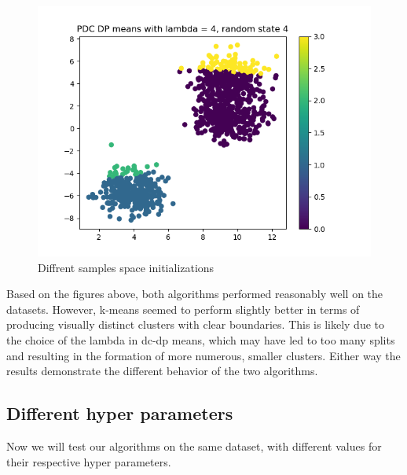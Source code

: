 \documentclass[12pt]{article}
\begin{document}
\begin{figure}
\begin{minipage}{0.5\textwidth}
    \end{minipage}
    \begin{minipage}{0.5\textwidth}
    \centering
    \includegraphics[scale=0.4]{images/task2_drs_rs4__l4}
    \end{minipage}
    \caption{Diffrent samples space initializations}\label{fig:figure4}
\end{figure}

Based on the figures above, both algorithms performed reasonably well on the datasets.
However, k-means seemed to perform slightly better in terms of producing visually distinct clusters with clear boundaries.
This is likely due to the choice of the lambda in dc-dp means,
which may have led to too many splits and resulting in the formation of more numerous, smaller clusters.
Either way the results demonstrate the different behavior of the two algorithms.
\pagebreak
\subsection*{Different hyper parameters}
Now we will test our algorithms on the same dataset, with different values for their respective hyper parameters.
\end{document}
